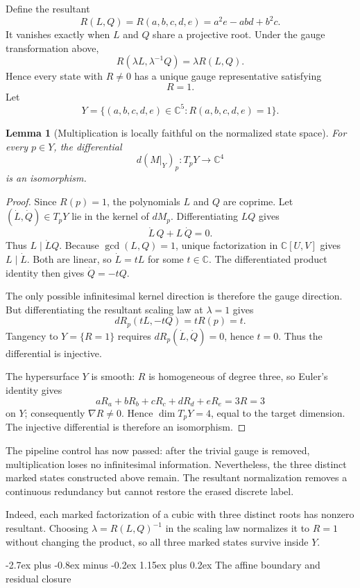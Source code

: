 \documentclass[11pt,letterpaper]{article}
\makeatletter
\newcommand{\C}{\mathbb{C}}
\theoremstyle{jgpplain}
\newtheorem{lemma}[theorem]{Lemma}
\renewcommand{\section}{\@startsection{section}{1}{0pt}%
  {-2.7ex plus -0.8ex minus -0.2ex}%
  {1.15ex plus 0.2ex}%
  {\normalfont\sffamily\Large\bfseries\color{JGPBlue}}}
\makeatother
\begin{document}
Define the resultant
\[
R(L,Q)
=R(a,b,c,d,e)
=a^2e-abd+b^2c.
\]
It vanishes exactly when \(L\) and \(Q\) share a projective root. Under the
gauge transformation above,
\[
R(\lambda L,\lambda^{-1}Q)=\lambda R(L,Q).
\]
Hence every state with \(R\neq0\) has a unique gauge representative satisfying
\[
R=1.
\]
Let
\[
Y=\{(a,b,c,d,e)\in\C^5:R(a,b,c,d,e)=1\}.
\]

\begin{lemma}[Multiplication is locally faithful on the normalized state space]
\label{lem:local-fidelity}
For every \(p\in Y\), the differential
\[
d(M|_Y)_p:T_pY\longrightarrow\C^4
\]
is an isomorphism.
\end{lemma}

\begin{proof}
Since \(R(p)=1\), the polynomials \(L\) and \(Q\) are coprime. Let
\((\dot L,\dot Q)\in T_pY\) lie in the kernel of \(dM_p\).
Differentiating \(LQ\) gives
\[
\dot L\,Q+L\,\dot Q=0.
\]
Thus \(L\mid \dot LQ\). Because \(\gcd(L,Q)=1\), unique factorization in
\(\C[U,V]\) gives \(L\mid\dot L\). Both are linear, so
\(\dot L=tL\) for some \(t\in\C\). The differentiated product identity then
gives \(\dot Q=-tQ\).

The only possible infinitesimal kernel direction is therefore the gauge
direction. But differentiating the resultant scaling law at \(\lambda=1\)
gives
\[
dR_p(tL,-tQ)=tR(p)=t.
\]
Tangency to \(Y=\{R=1\}\) requires \(dR_p(\dot L,\dot Q)=0\), hence \(t=0\).
Thus the differential is injective.

The hypersurface \(Y\) is smooth: \(R\) is homogeneous of degree three, so
Euler's identity gives
\[
aR_a+bR_b+cR_c+dR_d+eR_e=3R=3
\]
on \(Y\); consequently \(\nabla R\neq0\). Hence
\(\dim T_pY=4\), equal to the target dimension. The injective differential is
therefore an isomorphism.
\end{proof}

The pipeline control has now passed: after the trivial gauge is removed,
multiplication loses no infinitesimal information. Nevertheless, the three
distinct marked states constructed above remain. The resultant normalization
removes a continuous redundancy but cannot restore the erased discrete label.

Indeed, each marked factorization of a cubic with three distinct roots has
nonzero resultant. Choosing \(\lambda=R(L,Q)^{-1}\) in the scaling law
normalizes it to \(R=1\) without changing the product, so all three marked
states survive inside \(Y\).

\section{The affine boundary and residual closure}
\end{document}
